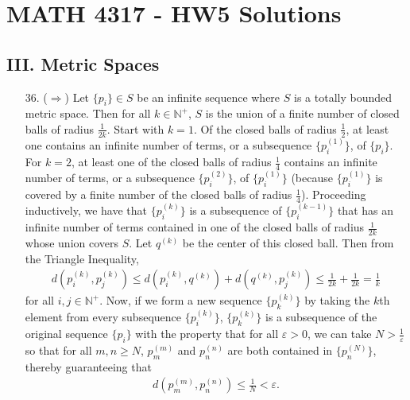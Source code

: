 \documentclass[a4paper,12pt]{article}
\begin{document}
    \section*{MATH 4317 - HW5 Solutions}
    \subsection*{III. Metric Spaces}
    \begin{enumerate}
        \item[36.]
            ($\Rightarrow$) Let $\{ p_i \} \in S$ be an infinite sequence where $S$ is a totally bounded metric space. Then for all $k \in \mathbb{N}^+$, $S$ is the union of a finite number of closed balls of radius $\frac{1}{2k}$. Start with $k = 1$. Of the closed balls of radius $\frac{1}{2}$, at least one contains an infinite number of terms, or a subsequence $\{ p_i^{(1)} \}$, of $\{ p_i \}$. For $k = 2$, at least one of the closed balls of radius $\frac{1}{4}$ contains an infinite number of terms, or a subsequence $\{ p_i^{(2)} \}$, of $\{ p_i^{(1)} \}$ (because $\{ p_i^{(1)} \}$ is covered by a finite number of the closed balls of radius $\frac{1}{4}$). Proceeding inductively, we have that $\{ p_i^{(k)} \}$ is a subsequence of $\{ p_i^{(k - 1)} \}$ that has an infinite number of terms contained in one of the closed balls of radius $\frac{1}{2k}$ whose union covers $S$. Let $q^{(k)}$ be the center of this closed ball. Then from the Triangle Inequality,
            \begin{align*}
                d(p_i^{(k)}, p_j^{(k)}) \leq d(p_i^{(k)}, q^{(k)}) + d(q^{(k)}, p_j^{(k)}) \leq \frac{1}{2k} + \frac{1}{2k} = \frac{1}{k}
            \end{align*}
            for all $i, j \in \mathbb{N}^+$. Now, if we form a new sequence $\{ p_k^{(k)} \}$ by taking the $k$th element from every subsequence $\{ p_i^{(k)} \}$, $\{ p_k^{(k)} \}$ is a subsequence of the original sequence $\{ p_i \}$ with the property that for all $\varepsilon > 0$, we can take $N > \frac{1}{\varepsilon}$ so that for all $m, n \geq N$, $p_m^{(m)}$ and $p_n^{(n)}$ are both contained in $\{ p_n^{(N)} \}$, thereby guaranteeing that
            \begin{align*}
                d(p_m^{(m)}, p_n^{(n)}) \leq \frac{1}{N} < \varepsilon.
            \end{align*}

\end{enumerate}
\end{document}
